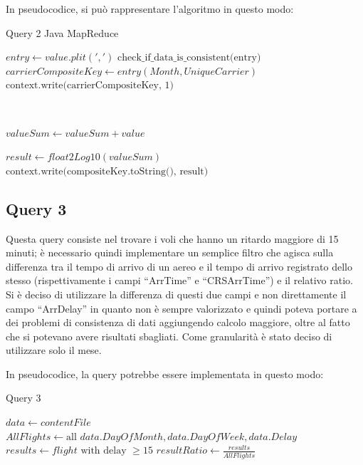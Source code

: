 \documentclass[11pt]{article} %
\begin{document}
In pseudocodice, si può rappresentare l'algoritmo in questo modo:

\newpage

\begin{algorithm}
\caption{Query 2 Java MapReduce}\label{euclid}
\begin{algorithmic}[0]


\State $entry \gets value.plit(',')$
\State $\text{check\_if\_data\_is\_consistent(entry)}$
\State $carrierCompositeKey \gets entry(Month, UniqueCarrier)$
\State $\text{context.write(carrierCompositeKey, 1)}$

\EndProcedure

~


	\State $valueSum \gets valueSum + value$
\EndFor

\State $result \gets float2Log10(valueSum)$
\State $\text{context.write(compositeKey.toString(), result)}$

\EndProcedure


\end{algorithmic}
\end{algorithm}


\subsection{Query 3}

Questa query consiste nel trovare i voli che hanno un ritardo maggiore di 15 minuti; è necessario quindi implementare un semplice filtro che agisca sulla differenza tra il tempo di arrivo di un aereo e il tempo di arrivo registrato dello stesso (rispettivamente i campi ``ArrTime'' e ``CRSArrTime'') e il relativo ratio. Si è deciso di utilizzare la differenza di questi due campi e non direttamente il campo ``ArrDelay'' in quanto non è sempre valorizzato e quindi poteva portare a dei problemi di consistenza di dati aggiungendo calcolo maggiore, oltre al fatto che si potevano avere risultati sbagliati. Come granularità è stato deciso di utilizzare solo il mese.

In pseudocodice, la query potrebbe essere implementata in questo modo:

\begin{algorithm}
\caption{Query 3}\label{euclid}
\begin{algorithmic}[0]
\State $data \gets contentFile$
\State $AllFlights \gets \text{all } data.DayOfMonth, data.DayOfWeek, data.Delay$
\State $results \gets flight \text{ with delay } \geqslant 15$
\State $resultRatio \gets \frac{results}{AllFlights}$
\EndFor
\end{algorithmic}
\end{algorithm}
\end{document}
